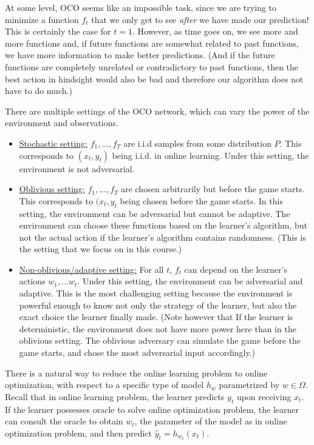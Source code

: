 At some level, OCO seems like an impossible task, since we are trying to minimize a function $f_t$ that we only get to see \textit{after} we have made our prediction! This is certainly the case for $t = 1$. However, as time goes on, we see more and more functions and, if future functions are somewhat related to past functions, we have more information to make better predictions. (And if the future functions are completely unrelated or contradictory to past functions, then the best action in hindsight would also be bad and therefore our algorithm does not have to do much.)

There are multiple settings of the OCO network, which can vary the power of the environment and observations.

\begin{itemize}
    \item \underline{Stochastic setting:} $f_1,...,f_T$ are i.i.d samples from some distribution $P$. This corresponds to $(x_t, y_t)$ being i.i.d. in online learning. Under this setting, the environment is not adversarial.
    \item \underline{Oblivious setting:} $f_1,...,f_T$ are chosen arbitrarily but before the game starts. This corresponds to $(x_t, y_t$ being chosen before the game starts. In this setting, the environment can be adversarial but cannot be adaptive. The environment can choose these functions based on the learner's algorithm, but not the actual action if the learner's algorithm contains randomness. (This is the setting that we focus on in this course.)
    \item \underline{Non-oblivious/adaptive setting:} For all $t$, $f_t$ can depend on the learner's actions $w_1,...w_t$. Under this setting, the environment can be adversarial and adaptive. This is the most challenging setting because the environment is powerful enough to know not only the strategy of the learner, but also the exact choice the learner finally made. (Note however that If the learner is deterministic, the environment does not have more power here than in the oblivious setting. The oblivious adversary can simulate the game before the game starts, and chose the most adversarial input accordingly.)
\end{itemize}
 
There is a natural way to reduce the online learning problem to online optimization, with respect to a specific type of model $h_{w}$ parametrized by $w \in \Omega$. Recall that in online learning problem, the learner predicts $y_t$ upon receiving $x_t$. If the learner possesses oracle to solve online optimization problem, the learner can consult the oracle to obtain $w_t$, the parameter of the model as in online optimization problem, and then predict $\hat{y}_t = h_{w_t}(x_t)$.

